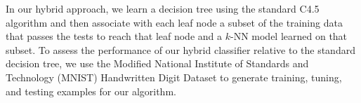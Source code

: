 In our hybrid approach, we learn a decision tree using the standard C4.5 algorithm and then associate with each leaf node a subset of the training data that passes the tests to reach that leaf node and a $k$-NN model learned on that subset. To assess the performance of our hybrid classifier relative to the standard decision tree, we use the Modified National Institute of Standards and Technology (MNIST) Handwritten Digit Dataset \cite{MNISTDatabase} to generate training, tuning, and testing examples for our algorithm.
